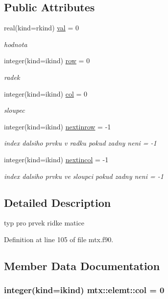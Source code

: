 \subsection*{\-Public \-Attributes}
\begin{DoxyCompactItemize}
\item 
real(kind=rkind) \hyperlink{structmtx_1_1elemt_ad16a0504f754e953a16926f9414e12b5}{val} = 0
\begin{DoxyCompactList}\small\item\em hodnota \end{DoxyCompactList}\item 
integer(kind=ikind) \hyperlink{structmtx_1_1elemt_aa2b8f13c3e5c242af5d3d6a13f0deecf}{row} = 0
\begin{DoxyCompactList}\small\item\em radek \end{DoxyCompactList}\item 
integer(kind=ikind) \hyperlink{structmtx_1_1elemt_ae051633c302f8ceebc82d612c74ac62f}{col} = 0
\begin{DoxyCompactList}\small\item\em sloupec \end{DoxyCompactList}\item 
integer(kind=ikind) \hyperlink{structmtx_1_1elemt_a49dfbfe79b719bc8c5d7678809b799b7}{nextinrow} = -\/1
\begin{DoxyCompactList}\small\item\em index dalsiho prvku v radku pokud zadny neni = -\/1 \end{DoxyCompactList}\item 
integer(kind=ikind) \hyperlink{structmtx_1_1elemt_a2a4b03e64a45c4349c06a426a0e3e064}{nextincol} = -\/1
\begin{DoxyCompactList}\small\item\em index dalsiho prvku ve sloupci pokud zadny neni = -\/1 \end{DoxyCompactList}\end{DoxyCompactItemize}


\subsection{\-Detailed \-Description}
typ pro prvek ridke matice 

\-Definition at line 105 of file mtx.\-f90.



\subsection{\-Member \-Data \-Documentation}
\hypertarget{structmtx_1_1elemt_ae051633c302f8ceebc82d612c74ac62f}{
\subsubsection[{col}]{\setlength{\rightskip}{0pt plus 5cm}integer(kind=ikind) {\bf mtx\-::elemt\-::col} = 0}}\label{structmtx_1_1elemt_ae051633c302f8ceebc82d612c74ac62f}


